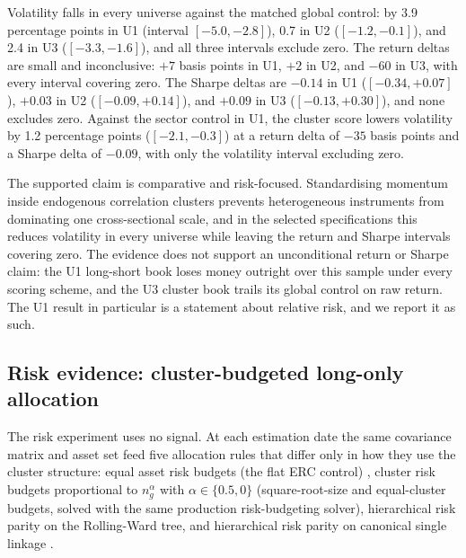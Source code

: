 \documentclass{rQUF2e}
\theoremstyle{plain}
\theoremstyle{remark}
\begin{document}
Volatility falls in every universe against the matched global control: by 3.9
percentage points in U1 (interval $[-5.0, -2.8]$), 0.7 in U2
($[-1.2, -0.1]$), and 2.4 in U3 ($[-3.3, -1.6]$), and all three intervals
exclude zero. The return deltas are small and inconclusive: $+7$ basis points
in U1, $+2$ in U2, and $-60$ in U3, with every interval covering zero. The
Sharpe deltas are $-0.14$ in U1 ($[-0.34, +0.07]$), $+0.03$ in U2
($[-0.09, +0.14]$), and $+0.09$ in U3 ($[-0.13, +0.30]$), and none excludes
zero. Against the sector control in U1, the cluster score lowers volatility
by 1.2 percentage points ($[-2.1, -0.3]$) at a return delta of $-35$ basis
points and a Sharpe delta of $-0.09$, with only the volatility interval
excluding zero.

The supported claim is comparative and risk-focused. Standardising momentum
inside endogenous correlation clusters prevents heterogeneous instruments from
dominating one cross-sectional scale, and in the selected specifications this
reduces volatility in every universe while leaving the return and Sharpe
intervals covering zero. The evidence does not support an unconditional
return or Sharpe claim: the U1 long-short book loses money outright over this
sample under every scoring scheme, and the U3 cluster book trails its global
control on raw return. The U1 result in particular is a statement about
relative risk, and we report it as such.

\subsection{Risk evidence: cluster-budgeted long-only allocation}
\label{sec:risk}

The risk experiment uses no signal. At each estimation date the same
covariance matrix and asset set feed five allocation rules that differ only in
how they use the cluster structure: equal asset risk budgets (the flat ERC
control) \citep{maillard2010properties}, cluster risk budgets proportional to
$n_g^{\alpha}$ with $\alpha \in \{0.5, 0\}$ (square-root-size and
equal-cluster budgets, solved with the same production risk-budgeting solver),
hierarchical risk parity on the Rolling-Ward tree, and hierarchical risk
parity on canonical single linkage \citep{lopezdeprado2016building}.
\end{document}
